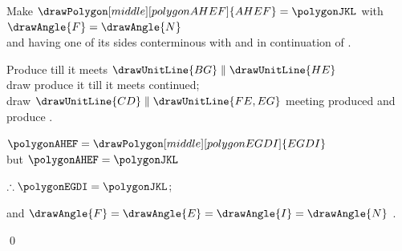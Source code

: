 \documentclass[booklanguage=english]{byrnebook}
\begin{document}
\begin{center}
Make $\drawPolygon[middle][polygonAHEF]{AHEF} = \polygonJKL$ with $\drawAngle{F} = \drawAngle{N}$ \\
and having one of its sides  conterminous with and in continuation of .

Produce  till it meets $\drawUnitLine{BG} \parallel \drawUnitLine{HE}$\\
draw  produce it till it meets  continued;\\
draw $\drawUnitLine{CD} \parallel \drawUnitLine{FE,EG}$ meeting  produced and produce .

$\polygonAHEF = \drawPolygon[middle][polygonEGDI]{EGDI}$ \\
but $\polygonAHEF = \polygonJKL$ \byref{\constref}

$\therefore \polygonEGDI = \polygonJKL$;

and $\drawAngle{F} = \drawAngle{E} =\drawAngle{I} = \drawAngle{N}$ . %
\end{center}

\qed
\end{document}
